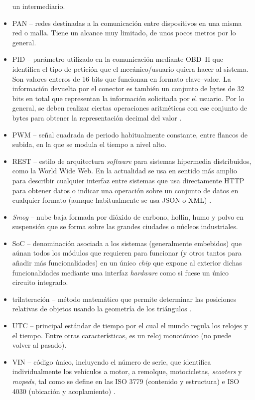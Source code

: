 \begin{itemize}
        un intermediario.
  \item \ac{PAN} -- redes destinadas a la comunicación entre dispositivos en una
        misma red o malla. Tiene un alcance muy limitado, de unos pocos metros por
        lo general.
  \item \ac{PID} -- parámetro utilizado en la comunicación mediante \ac{OBD}--II que
        identifica el tipo de petición que el mecánico/usuario quiera hacer al sistema.
        Son valores enteros de 16 bits que funcionan en formato clave--valor. La información
        devuelta por el conector es también un conjunto de bytes de 32 bits en total que
        representan la información solicitada por el usuario. Por lo general, se deben
        realizar ciertas operaciones aritméticas con ese conjunto de bytes para obtener
        la representación decimal del valor \cite{OBDIIPIDs2021}.
  \item \ac{PWM} -- señal cuadrada de periodo habitualmente constante, entre flancos de
        subida, en la que se modula el tiempo a nivel alto.
  \item \ac{REST} -- estilo de arquitectura \textit{software} para sistemas hipermedia
        distribuidos, como la World Wide Web. En la actualidad se usa en sentido más
        amplio para describir cualquier interfaz entre sistemas que usa directamente
        HTTP para obtener datos o indicar una operación sobre un conjunto de datos
        en cualquier formato (aunque habitualmente se usa JSON o XML) \cite{TransferenciaEstadoRepresentacional2022}.
  \item \textit{Smog} -- nube baja formada por dióxido de carbono, hollín, humo y polvo
        en suspensión que se forma sobre las grandes ciudades o núcleos industriales.
  \item \ac{SoC} -- denominación asociada a los sistemas (generalmente embebidos) que
        aúnan todos los módulos que requieren para funcionar (y otros tantos para añadir más
        funcionalidades) en un único \textit{chip} que expone al exterior dichas
        funcionalidades mediante una interfaz \textit{hardware} como si fuese un único
        circuito integrado.
  \item trilateración -- método matemático que permite determinar las posiciones
        relativas de objetos usando la geometría de los triángulos \cite{Trilateracion2021}.
  \item \ac{UTC} -- principal estándar de tiempo por el cual el mundo regula los relojes y el tiempo.
        Entre otras características, es un reloj monotónico (no puede volver al pasado).
  \item \ac{VIN} -- código único, incluyendo el número de serie, que identifica individualmente
        los vehículos a motor, a remolque, motocicletas, \textit{scooters} y \textit{mopeds},
        tal como se define en las ISO 3779 (contenido y estructura) e ISO 4030 (ubicación
        y acoplamiento) \cite{VehicleIdentificationNumber2022}.
\end{itemize}
